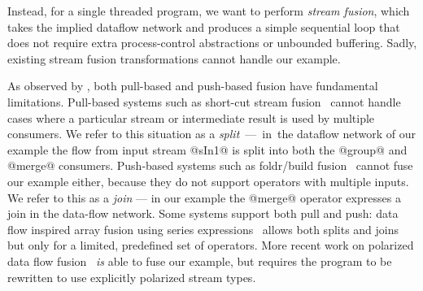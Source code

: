 
Instead, for a single threaded program, we want to perform \emph{stream fusion}, which takes the implied dataflow network and produces a simple sequential loop that does not require extra process-control abstractions or unbounded buffering. Sadly, existing stream fusion transformations cannot handle our example. 

As observed by \citet{kay2009you}, both pull-based and push-based fusion have fundamental limitations. Pull-based systems such as short-cut stream fusion~\cite{coutts2007stream} cannot handle cases where a particular stream or intermediate result is used by multiple consumers. We refer to this situation as a \mbox{\emph{split} --- in the} dataflow network of our example the flow from input stream @sIn1@ is split into both the @group@ and @merge@ consumers. Push-based systems such as foldr/build fusion~\cite{gill1993short} cannot fuse our example either, because they do not support operators with multiple inputs. We refer to this as a \emph{join} --- in our example the @merge@ operator expresses a join in the data-flow network. Some systems support both pull and push: data flow inspired array fusion using series expressions~\cite{lippmeier2013data} allows both splits and joins but only for a limited, predefined set of operators. More recent work on polarized data flow fusion~\cite{lippmeier2016polarized} \emph{is} able to fuse our example, but requires the program to be rewritten to use explicitly polarized stream types. 


